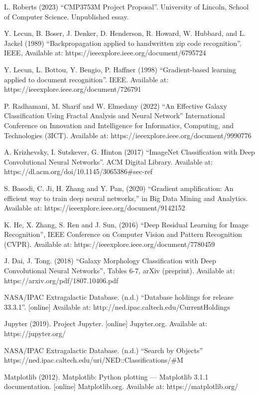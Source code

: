 \documentclass[12pt,runningheads]{llncs}
\begin{document}
\begin{thebibliography}{20}

\bibitem{}
L. Roberts (2023) “CMP3753M Project Proposal”. University of Lincoln, School of Computer Science. Unpublished essay.

\bibitem{}
Y. Lecun, B. Boser, J. Denker, D. Henderson, R. Howard, W. Hubbard, and L. Jackel (1989) “Backpropagation applied to handwritten zip code recognition”. IEEE, Available at: https://ieeexplore.ieee.org/document/6795724

\bibitem{}
Y. Lecun, L. Bottou, Y. Bengio, P. Haffner (1998) “Gradient-based learning applied to document recognition”. IEEE. Available at: https://ieeexplore.ieee.org/document/726791

\bibitem{}
P. Radhamani, M. Sharif and W. Elmedany (2022) “An Effective Galaxy Classification Using Fractal Analysis and Neural Network” International Conference on Innovation and Intelligence for Informatics, Computing, and Technologies (3ICT). Available at: https://ieeexplore.ieee.org/document/9990776

\bibitem{}
A. Krizhevsky, I. Sutskever, G. Hinton (2017) “ImageNet Classification with Deep
Convolutional Neural Networks”. ACM Digital Library. Available at: https://dl.acm.org/doi/10.1145/3065386\#sec-ref

\bibitem{}
S. Basodi, C. Ji, H. Zhang and Y. Pan, (2020) “Gradient amplification: An efficient way to train deep neural networks,” in Big Data Mining and Analytics. Available at: https://ieeexplore.ieee.org/document/9142152

\bibitem{}
K. He, X. Zhang, S. Ren and J. Sun, (2016) “Deep Residual Learning for Image Recognition”, IEEE Conference on Computer Vision and Pattern Recognition (CVPR). Available at: https://ieeexplore.ieee.org/document/7780459

\bibitem{}
J. Dai, J. Tong. (2018) “Galaxy Morphology Classification with Deep Convolutional Neural Networks”, Tables 6-7, arXiv (preprint). Available at: https://arxiv.org/pdf/1807.10406.pdf

\bibitem{}
NASA/IPAC Extragalactic Database. (n.d.) “Database holdings for release 33.3.1”. [online] Available at: http://ned.ipac.caltech.edu/CurrentHoldings

\bibitem{}
Jupyter (2019). Project Jupyter. [online] Jupyter.org. Available at: https://jupyter.org/

\bibitem{}
NASA/IPAC Extragalactic Database. (n.d.) “Search by Objects” https://ned.ipac.caltech.edu/uri/NED::Classifications/\#M

\bibitem{}
Matplotlib (2012). Matplotlib: Python plotting — Matplotlib 3.1.1 documentation. [online] Matplotlib.org. Available at: https://matplotlib.org/

\end{thebibliography}
\end{document}
